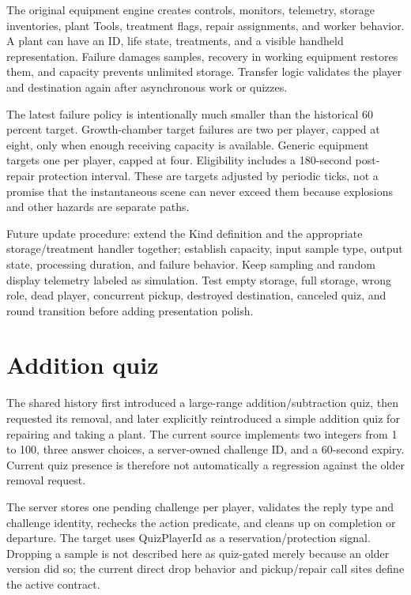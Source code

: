 The original equipment engine creates controls, monitors, telemetry, storage inventories, plant Tools, treatment flags, repair assignments, and worker behavior.\allowbreak{} A plant can have an ID, life state, treatments, and a visible handheld representation.\allowbreak{} Failure damages samples, recovery in working equipment restores them, and capacity prevents unlimited storage.\allowbreak{} Transfer logic validates the player and destination again after asynchronous work or quizzes.\allowbreak{}

The latest failure policy is intentionally much smaller than the historical 60 percent target.\allowbreak{} Growth-chamber target failures are two per player, capped at eight, only when enough receiving capacity is available.\allowbreak{} Generic equipment targets one per player, capped at four.\allowbreak{} Eligibility includes a 180-second post-repair protection interval.\allowbreak{} These are targets adjusted by periodic ticks, not a promise that the instantaneous scene can never exceed them because explosions and other hazards are separate paths.\allowbreak{}

Future update procedure: extend the Kind definition and the appropriate storage/\allowbreak{}treatment handler together; establish capacity, input sample type, output state, processing duration, and failure behavior.\allowbreak{} Keep sampling and random display telemetry labeled as simulation.\allowbreak{} Test empty storage, full storage, wrong role, dead player, concurrent pickup, destroyed destination, canceled quiz, and round transition before adding presentation polish.\allowbreak{}

\section{Addition quiz}
The shared history first introduced a large-range addition/\allowbreak{}subtraction quiz, then requested its removal, and later explicitly reintroduced a simple addition quiz for repairing and taking a plant.\allowbreak{} The current source implements two integers from 1 to 100, three answer choices, a server-owned challenge ID, and a 60-second expiry.\allowbreak{} Current quiz presence is therefore not automatically a regression against the older removal request.\allowbreak{}

The server stores one pending challenge per player, validates the reply type and challenge identity, rechecks the action predicate, and cleans up on completion or departure.\allowbreak{} The target uses QuizPlayerId as a reservation/\allowbreak{}protection signal.\allowbreak{} Dropping a sample is not described here as quiz-gated merely because an older version did so; the current direct drop behavior and pickup/\allowbreak{}repair call sites define the active contract.\allowbreak{}

